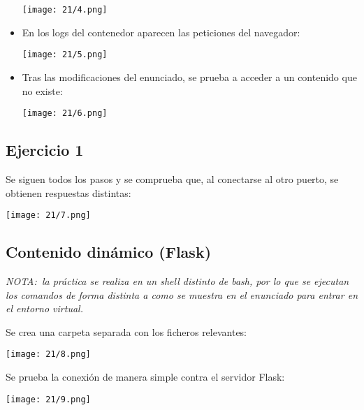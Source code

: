 \begin{itemize}
\begin{minipage}{\linewidth}
			\texttt{[image: 21/4.png]}
			\label{fig:2/4}
		\end{minipage}
	\item En los logs del contenedor aparecen las peticiones del navegador: \\
		\begin{minipage}{\linewidth}
			\centering
			\texttt{[image: 21/5.png]}
			\label{fig:2/5}
		\end{minipage}
	\item Tras las modificaciones del enunciado, se prueba a acceder a un contenido
		que no existe: \\
		\begin{minipage}{\linewidth}
			\centering
			\texttt{[image: 21/6.png]}
			\label{fig:2/6}
		\end{minipage}
\end{itemize}
\subsection{Ejercicio 1}
Se siguen todos los pasos y se comprueba que, al conectarse al otro puerto, se obtienen
respuestas distintas: \\
\begin{minipage}{\linewidth}
	\centering
	\texttt{[image: 21/7.png]}
	\label{fig:2/7}
\end{minipage}

\subsection{Contenido dinámico (Flask)}
\textit{NOTA:~la práctica se realiza en un shell distinto de bash, por lo que se ejecutan
	los comandos de forma distinta a como se muestra en el enunciado para entrar en el
	entorno virtual.}

Se crea una carpeta separada con los ficheros relevantes: \\
\begin{minipage}{\linewidth}
	\centering
	\texttt{[image: 21/8.png]}
	\label{fig:2/8}
\end{minipage}

Se prueba la conexión de manera simple contra el servidor Flask: \\
\begin{minipage}{\linewidth}
	\centering
	\texttt{[image: 21/9.png]}
	\label{fig:2/9}
\end{minipage}

